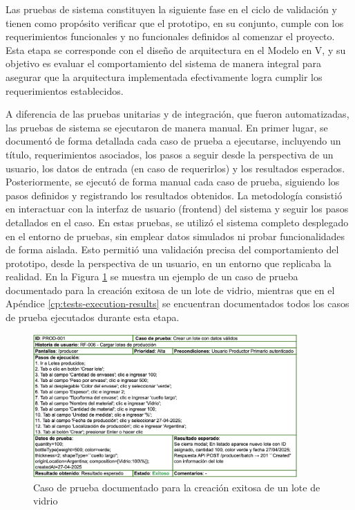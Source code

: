 Las pruebas de sistema constituyen la siguiente fase en el ciclo de validación y tienen como propósito verificar que el prototipo, en su conjunto, cumple con los requerimientos funcionales y no funcionales definidos al comenzar el proyecto. Esta etapa se corresponde con el diseño de arquitectura en el Modelo en V, y su objetivo es evaluar el comportamiento del sistema de manera integral para asegurar que la arquitectura implementada efectivamente logra cumplir los requerimientos establecidos.

A diferencia de las pruebas unitarias y de integración, que fueron automatizadas, las pruebas de sistema se ejecutaron de manera manual. En primer lugar, se documentó de forma detallada cada caso de prueba a ejecutarse, incluyendo un título, requerimientos asociados, los pasos a seguir desde la perspectiva de un usuario, los datos de entrada (en caso de requerirlos) y los resultados esperados. Posteriormente, se ejecutó de forma manual cada caso de prueba, siguiendo los pasos definidos y registrando los resultados obtenidos. La metodología consistió en interactuar con la interfaz de usuario (frontend) del sistema y seguir los pasos detallados en el caso. En estas pruebas, se utilizó el sistema completo desplegado en el entorno de pruebas, sin emplear datos simulados ni probar funcionalidades de forma aislada. Esto permitió una validación precisa del comportamiento del prototipo, desde la perspectiva de un usuario, en un entorno que replicaba la realidad. En la Figura \ref{fig:system-test-case-example} se muestra un ejemplo de un caso de prueba documentado para la creación exitosa de un lote de vidrio, mientras que en el Apéndice \ref{cp:tests-execution-results} se encuentran documentados todos los casos de prueba ejecutados durante esta etapa.

\begin{figure}[!tb]
	\centering
	\includegraphics[width=0.9\textwidth]{Figures/system-test-case-example.png}
	\caption{Caso de prueba documentado para la creación exitosa de un lote de vidrio}
	\label{fig:system-test-case-example}
\end{figure}

